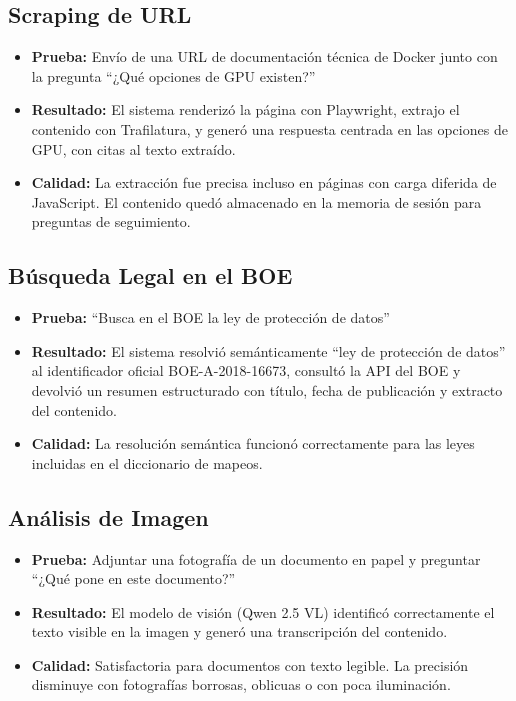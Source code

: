 \subsection{Scraping de URL}

\begin{itemize}
    \item \textbf{Prueba:} Envío de una URL de documentación técnica de Docker junto con la pregunta ``¿Qué opciones de GPU existen?''
    \item \textbf{Resultado:} El sistema renderizó la página con Playwright, extrajo el contenido con Trafilatura, y generó una respuesta centrada en las opciones de GPU, con citas al texto extraído.
    \item \textbf{Calidad:} La extracción fue precisa incluso en páginas con carga diferida de JavaScript. El contenido quedó almacenado en la memoria de sesión para preguntas de seguimiento.
\end{itemize}

\subsection{Búsqueda Legal en el BOE}

\begin{itemize}
    \item \textbf{Prueba:} ``Busca en el BOE la ley de protección de datos''
    \item \textbf{Resultado:} El sistema resolvió semánticamente ``ley de protección de datos'' al identificador oficial BOE-A-2018-16673, consultó la API del BOE y devolvió un resumen estructurado con título, fecha de publicación y extracto del contenido.
    \item \textbf{Calidad:} La resolución semántica funcionó correctamente para las leyes incluidas en el diccionario de mapeos.
\end{itemize}

\subsection{Análisis de Imagen}

\begin{itemize}
    \item \textbf{Prueba:} Adjuntar una fotografía de un documento en papel y preguntar ``¿Qué pone en este documento?''
    \item \textbf{Resultado:} El modelo de visión (Qwen 2.5 VL) identificó correctamente el texto visible en la imagen y generó una transcripción del contenido.
    \item \textbf{Calidad:} Satisfactoria para documentos con texto legible. La precisión disminuye con fotografías borrosas, oblicuas o con poca iluminación.
\end{itemize}

